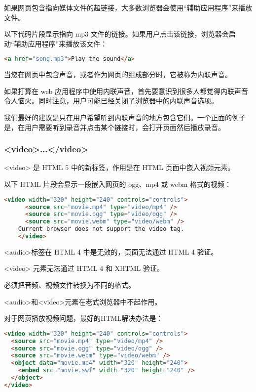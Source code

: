 如果网页包含指向媒体文件的超链接，大多数浏览器会使用“辅助应用程序”来播放文件。

以下代码片段显示指向 mp3 文件的链接。如果用户点击该链接，浏览器会启动“辅助应用程序”来播放该文件：

\begin{lstlisting}[language=HTML]
	<a href="song.mp3">Play the sound</a>
\end{lstlisting}

当您在网页中包含声音，或者作为网页的组成部分时，它被称为内联声音。

如果打算在 web 应用程序中使用内联声音，首先要意识到很多人都觉得内联声音令人恼火。同时注意，用户可能已经关闭了浏览器中的内联声音选项。

我们最好的建议是只在用户希望听到内联声音的地方包含它们。一个正面的例子是，在用户需要听到录音并点击某个链接时，会打开页面然后播放录音。

\subsubsection{<video>...</video>}

<video> 是 HTML 5 中的新标签，作用是在 HTML 页面中嵌入视频元素。

以下 HTML 片段会显示一段嵌入网页的 ogg、mp4 或 webm 格式的视频：

\begin{lstlisting}[language=HTML]
	<video width="320" height="240" controls="controls">
	  <source src="movie.mp4" type="video/mp4" />
	  <source src="movie.ogg" type="video/ogg" />
	  <source src="movie.webm" type="video/webm" />
	Current browser does not support the video tag.
	</video>
\end{lstlisting}

\begin{compactitem}
\item <audio>标签在 HTML 4 中是无效的，页面无法通过 HTML 4 验证。
\item <video> 元素无法通过 HTML 4 和 XHTML 验证。
\item 必须把音频、视频文件转换为不同的格式。
\item <audio>和<video>元素在老式浏览器中不起作用。
\end{compactitem}


对于网页播放视频问题，最好的HTML解决办法是：

\begin{lstlisting}[language=HTML]
<video width="320" height="240" controls="controls">
  <source src="movie.mp4" type="video/mp4" />
  <source src="movie.ogg" type="video/ogg" />
  <source src="movie.webm" type="video/webm" />
  <object data="movie.mp4" width="320" height="240">
    <embed src="movie.swf" width="320" height="240" />
  </object>
</video>
\end{lstlisting}

